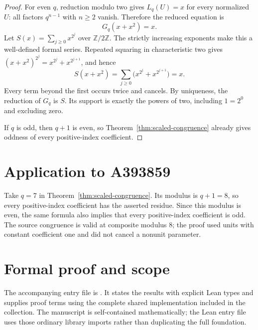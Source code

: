 \documentclass[11pt,a4paper]{article}
\theoremstyle{remark}\newtheorem{remark}[theorem]{Remark}
\newcommand{\Z}{\mathbb Z}
\begin{document}
\begin{proof}
For even $q$, reduction modulo two gives $L_q(U)=x$ for every
normalized $U$: all factors $q^{n-1}$ with $n\ge2$ vanish.
Therefore the reduced equation is
\[
G_q(x+x^2)=x.
\]
Let $S(x)=\sum_{j\ge0}x^{2^j}$ over $\Z/2\Z$.
The strictly increasing exponents make this a well-defined formal
series. Repeated squaring in characteristic two gives
$(x+x^2)^{2^j}=x^{2^j}+x^{2^{j+1}}$, and hence
\[
S(x+x^2)
=\sum_{j\ge0}\bigl(x^{2^j}+x^{2^{j+1}}\bigr)=x.
\]
Every term beyond the first occurs twice and cancels. By uniqueness,
the reduction of $G_q$ is $S$. Its support is exactly the powers
of two, including $1=2^0$ and excluding zero.

If $q$ is odd, then $q+1$ is even, so
Theorem~\ref{thm:scaled-congruence} already gives oddness of every
positive-index coefficient.
\end{proof}


\section{Application to A393859}
Take $q=7$ in Theorem~\ref{thm:scaled-congruence}.
Its modulus is $q+1=8$, so every positive-index
coefficient has the asserted residue. Since this modulus is even, the same formula also implies
that every positive-index coefficient is odd. The source congruence
is valid at composite modulus 8; the proof used units
with constant coefficient one and did not cancel a nonunit parameter.

\section{Formal proof and scope}
The accompanying entry file is .
It states the results with explicit Lean types and supplies proof terms
using the complete shared implementation included in the collection.
The manuscript is self-contained mathematically; the Lean entry file uses
those ordinary library imports rather than duplicating the full foundation.
\end{document}

